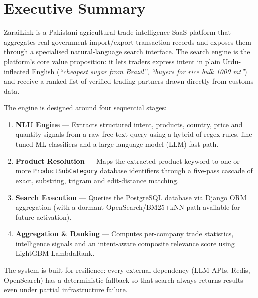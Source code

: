 \documentclass[12pt,a4paper]{article}
\begin{document}
\tableofcontents
\newpage

\section{Executive Summary}

ZaraiLink is a Pakistani agricultural trade intelligence SaaS platform that aggregates
real government import/export transaction records and exposes them through a specialised
natural-language search interface.  The search engine is the platform's core value
proposition: it lets traders express intent in plain Urdu-inflected English (\emph{``cheapest
sugar from Brazil''}, \emph{``buyers for rice bulk 1000 mt''}) and receive a ranked list of
verified trading partners drawn directly from customs data.

The engine is designed around four sequential stages:

\begin{enumerate}[leftmargin=2cm]
  \item \textbf{NLU Engine} --- Extracts structured intent, products, country, price and
        quantity signals from a raw free-text query using a hybrid of regex rules, fine-tuned
        ML classifiers and a large-language-model (LLM) fast-path.
  \item \textbf{Product Resolution} --- Maps the extracted product keyword to one or more
        \texttt{ProductSubCategory} database identifiers through a five-pass cascade of exact,
        substring, trigram and edit-distance matching.
  \item \textbf{Search Execution} --- Queries the PostgreSQL database via Django ORM
        aggregation (with a dormant OpenSearch/BM25+kNN path available for future activation).
  \item \textbf{Aggregation \& Ranking} --- Computes per-company trade statistics,
        intelligence signals and an intent-aware composite relevance score using LightGBM
        LambdaRank.
\end{enumerate}

The system is built for resilience: every external dependency (LLM APIs, Redis,
OpenSearch) has a deterministic fallback so that search always returns results even under
partial infrastructure failure.

\newpage
\end{document}
